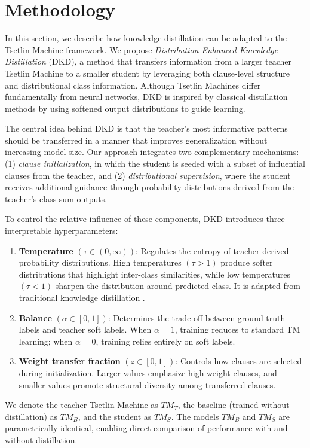 \documentclass[sn-mathphys-num]{sn-jnl}%
\theoremstyle{thmstyleone}%
\theoremstyle{thmstyletwo}%
\theoremstyle{thmstylethree}%
\begin{document}
\section{Methodology}
In this section, we describe how knowledge distillation can be adapted to the Tsetlin Machine framework. We propose \textit{Distribution-Enhanced Knowledge Distillation} (DKD), a method that transfers information from a larger teacher Tsetlin Machine to a smaller student by leveraging both clause-level structure and distributional class information. Although Tsetlin Machines differ fundamentally from neural networks, DKD is inspired by classical distillation methods by using softened output distributions to guide learning.

The central idea behind DKD is that the teacher's most informative patterns should be transferred in a manner that improves generalization without increasing model size. Our approach integrates two complementary mechanisms: (1) \textit{clause initialization}, in which the student is seeded with a subset of influential clauses from the teacher, and (2) \textit{distributional supervision}, where the student receives additional guidance through probability distributions derived from the teacher's class-sum outputs.

To control the relative influence of these components, DKD introduces three interpretable hyperparameters:
\begin{enumerate}
	\item \textbf{Temperature} $(\tau \in (0,\infty))$: Regulates the entropy of teacher-derived probability distributions. High temperatures $(\tau > 1)$ produce softer distributions that highlight inter-class similarities, while low temperatures $(\tau < 1)$ sharpen the distribution around predicted class. It is adapted from traditional knowledge distillation \cite{hinton2015distillingknowledgeneuralnetwork}.
	\item \textbf{Balance} $(\alpha \in [0,1])$: Determines the trade-off between ground-truth labels and teacher soft labels. When $\alpha = 1$, training reduces to standard TM learning; when $\alpha = 0$, training relies entirely on soft labels.
	\item \textbf{Weight transfer fraction} $(z \in [0,1])$: Controls how clauses are selected during initialization. Larger values emphasize high-weight clauses, and smaller values promote structural diversity among transferred clauses.
\end{enumerate}

We denote the teacher Tsetlin Machine as $TM_T$, the baseline (trained without distillation) as $TM_B$, and the student as $TM_S$. The models $TM_B$ and $TM_S$ are parametrically identical, enabling direct comparison of performance with and without distillation.
\end{document}
